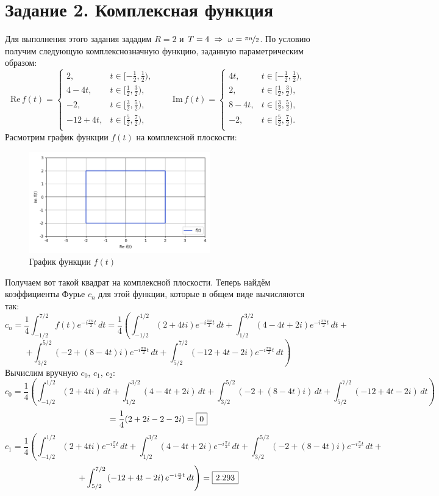 \documentclass[a4paper]{article}
\newcommand*\msquared[1]{\tikz[baseline=(char.base)]{
            \node[shape=rectangle,draw,inner sep=4pt] (char) {$\displaystyle #1$};}}
\begin{document}
\section{Задание 2. Комплексная функция}
Для выполнения этого задания зададим $R = 2$ и $T = 4\ \Rightarrow\ \omega = \nicefrac{\pi n}{2}$. По условию получим следующую комплекснозначную функцию, заданную параметрическим образом:
$$\text{Re}\,f(t) = \begin{cases}
    2, & t \in [-\frac{1}{2}, \frac{1}{2}),\\
    4-4t, & t \in [\frac{1}{2}, \frac{3}{2}),\\
    -2, & t \in [\frac{3}{2}, \frac{5}{2}),\\
    -12+4t, & t \in [\frac{5}{2}, \frac{7}{2}),\\
\end{cases}\qquad\text{Im}\,f(t) = \begin{cases}
    4t, & t \in [-\frac{1}{2}, \frac{1}{2}),\\
    2, & t \in [\frac{1}{2}, \frac{3}{2}),\\
    8-4t, & t \in [\frac{3}{2}, \frac{5}{2}),\\
    -2, & t \in [\frac{5}{2}, \frac{7}{2}).\\
\end{cases}$$
Расмотрим график функции $f(t)$ на комплексной плоскости:
\begin{figure}[H]
    \centering \includegraphics[width=0.7\textwidth]{param/func.png}
    \caption{График функции $f(t)$}
\end{figure}
Получаем вот такой квадрат на комплексной плоскости. Теперь найдём коэффициенты Фурье $c_n$ для этой функции, которые в общем виде вычисляются так:
$$c_n = \frac{1}{4}\int_{-1/2}^{7/2}f(t)e^{-i\frac{\pi n}{2}t}\,dt = \frac{1}{4}\left( \int_{-1/2}^{1/2} \left( 2 + 4ti \right)e^{-i\frac{\pi n}{2}t}\,dt + \int_{1/2}^{3/2}\left( 4 - 4t + 2i \right)e^{-i\frac{\pi n}{2}t}\,dt +  \right.$$
$$\left. + \int_{3/2}^{5/2}\left( -2 + (8 - 4t)i \right)e^{-i\frac{\pi n}{2}t}\,dt + \int_{5/2}^{7/2}\left( -12 + 4t -2i \right)e^{-i\frac{\pi n}{2}t}\,dt\right)$$
Вычислим вручную $c_0$, $c_1$, $c_2$:
$$c_0 = \frac{1}{4}\left( \int_{-1/2}^{1/2} \left( 2 + 4ti \right)\,dt + \int_{1/2}^{3/2}\left( 4 - 4t + 2i \right)\,dt + \int_{3/2}^{5/2}\left( -2 + (8 - 4t)i \right)\,dt + \int_{5/2}^{7/2}\left( -12 + 4t -2i \right)\,dt\right)$$
$$= \frac{1}{4}(2+2i-2-2i) = \msquared{0}$$
$$c_1 = \frac{1}{4}\left( \int_{-1/2}^{1/2} \left( 2 + 4ti \right)e^{-i\frac{\pi}{2}t}\,dt + \int_{1/2}^{3/2}\left( 4 - 4t + 2i \right)e^{-i\frac{\pi}{2}t}\,dt + \int_{3/2}^{5/2}\left( -2 + (8 - 4t)i \right)e^{-i\frac{\pi}{2}t}\,dt + \right.$$
$$\left.+ \int_{5/2}^{7/2}\left( -12 + 4t -2i \right)e^{-i\frac{\pi}{2}t}\,dt \right)=\msquared{2.293}$$
\end{document}
